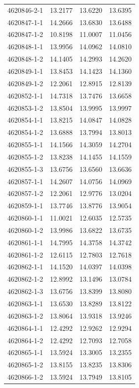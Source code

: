 \begin{longtable}{lrrr}
4620846-2-1 & 13.2177 & 13.6220 & 13.6395 \\
4620847-1-1 & 14.2666 & 13.6830 & 13.6488 \\
4620847-1-2 & 10.8198 & 11.0007 & 11.0456 \\
4620848-1-1 & 13.9956 & 14.0962 & 14.0810 \\
4620848-1-2 & 14.1405 & 14.2993 & 14.2620 \\
4620849-1-1 & 13.8453 & 14.1423 & 14.1360 \\
4620849-1-2 & 12.2061 & 12.8915 & 12.8139 \\
4620852-1-1 & 14.7318 & 13.7476 & 13.6658 \\
4620853-1-2 & 13.8504 & 13.9995 & 13.9997 \\
4620854-1-1 & 13.8215 & 14.0847 & 14.0828 \\
4620854-1-2 & 13.6888 & 13.7994 & 13.8013 \\
4620855-1-1 & 14.1566 & 14.3059 & 14.2704 \\
4620855-1-2 & 13.8238 & 14.1455 & 14.1559 \\
4620855-1-3 & 13.6756 & 13.6560 & 13.6636 \\
4620857-1-1 & 14.2607 & 14.0756 & 14.0969 \\
4620857-1-2 & 12.2061 & 12.9776 & 13.0204 \\
4620859-1-1 & 13.7746 & 13.8776 & 13.9054 \\
4620860-1-1 & 11.0021 & 12.6035 & 12.5735 \\
4620860-1-2 & 13.9986 & 13.6822 & 13.6735 \\
4620861-1-1 & 14.7995 & 14.3758 & 14.3742 \\
4620861-1-2 & 12.6115 & 12.7803 & 12.7618 \\
4620862-1-1 & 14.1520 & 14.0397 & 14.0398 \\
4620862-1-2 & 12.8992 & 13.1496 & 13.0784 \\
4620862-1-3 & 13.6756 & 13.8399 & 13.8080 \\
4620863-1-1 & 13.6530 & 13.8289 & 13.8122 \\
4620863-1-2 & 13.8064 & 13.9318 & 13.9246 \\
4620864-1-1 & 12.4292 & 12.9262 & 12.9294 \\
4620864-1-2 & 12.4292 & 12.7093 & 12.7058 \\
4620865-1-1 & 13.5924 & 13.3005 & 13.2355 \\
4620865-1-2 & 13.8155 & 13.8235 & 13.8306 \\
4620866-1-2 & 13.5924 & 13.7949 & 13.8105 \\

\end{longtable}
